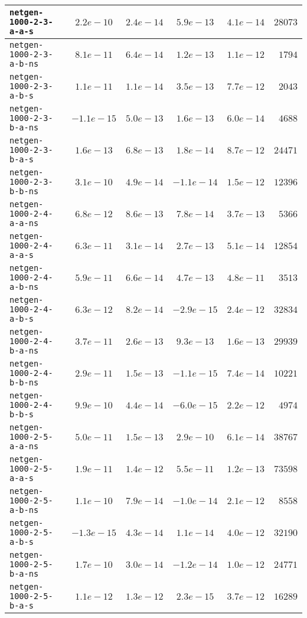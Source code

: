 \begin{center}
\begin{longtable}{|l || c | c | c | c | r|}
\hline
\texttt{netgen-1000-2-3-a-a-s} & $2.2e-10$ & $2.4e-14$ & $5.9e-13$ & $4.1e-14$ & $28073$ \\
\hline
\texttt{netgen-1000-2-3-a-b-ns} & $8.1e-11$ & $6.4e-14$ & $1.2e-13$ & $1.1e-12$ & $1794$ \\
\hline
\texttt{netgen-1000-2-3-a-b-s} & $1.1e-11$ & $1.1e-14$ & $3.5e-13$ & $7.7e-12$ & $2043$ \\
\hline
\texttt{netgen-1000-2-3-b-a-ns} & $-1.1e-15$ & $5.0e-13$ & $1.6e-13$ & $6.0e-14$ & $4688$ \\
\hline
\texttt{netgen-1000-2-3-b-a-s} & $1.6e-13$ & $6.8e-13$ & $1.8e-14$ & $8.7e-12$ & $24471$ \\
\hline
\texttt{netgen-1000-2-3-b-b-ns} & $3.1e-10$ & $4.9e-14$ & $-1.1e-14$ & $1.5e-12$ & $12396$ \\
\hline
\texttt{netgen-1000-2-4-a-a-ns} & $6.8e-12$ & $8.6e-13$ & $7.8e-14$ & $3.7e-13$ & $5366$ \\
\hline
\texttt{netgen-1000-2-4-a-a-s} & $6.3e-11$ & $3.1e-14$ & $2.7e-13$ & $5.1e-14$ & $12854$ \\
\hline
\texttt{netgen-1000-2-4-a-b-ns} & $5.9e-11$ & $6.6e-14$ & $4.7e-13$ & $4.8e-11$ & $3513$ \\
\hline
\texttt{netgen-1000-2-4-a-b-s} & $6.3e-12$ & $8.2e-14$ & $-2.9e-15$ & $2.4e-12$ & $32834$ \\
\hline
\texttt{netgen-1000-2-4-b-a-ns} & $3.7e-11$ & $2.6e-13$ & $9.3e-13$ & $1.6e-13$ & $29939$ \\
\hline
\texttt{netgen-1000-2-4-b-b-ns} & $2.9e-11$ & $1.5e-13$ & $-1.1e-15$ & $7.4e-14$ & $10221$ \\
\hline
\texttt{netgen-1000-2-4-b-b-s} & $9.9e-10$ & $4.4e-14$ & $-6.0e-15$ & $2.2e-12$ & $4974$ \\
\hline
\texttt{netgen-1000-2-5-a-a-ns} & $5.0e-11$ & $1.5e-13$ & $2.9e-10$ & $6.1e-14$ & $38767$ \\
\hline
\texttt{netgen-1000-2-5-a-a-s} & $1.9e-11$ & $1.4e-12$ & $5.5e-11$ & $1.2e-13$ & $73598$ \\
\hline
\texttt{netgen-1000-2-5-a-b-ns} & $1.1e-10$ & $7.9e-14$ & $-1.0e-14$ & $2.1e-12$ & $8558$ \\
\hline
\texttt{netgen-1000-2-5-a-b-s} & $-1.3e-15$ & $4.3e-14$ & $1.1e-14$ & $4.0e-12$ & $32190$ \\
\hline
\texttt{netgen-1000-2-5-b-a-ns} & $1.7e-10$ & $3.0e-14$ & $-1.2e-14$ & $1.0e-12$ & $24771$ \\
\hline
\texttt{netgen-1000-2-5-b-a-s} & $1.1e-12$ & $1.3e-12$ & $2.3e-15$ & $3.7e-12$ & $16289$ \\

\end{longtable}
\end{center}
